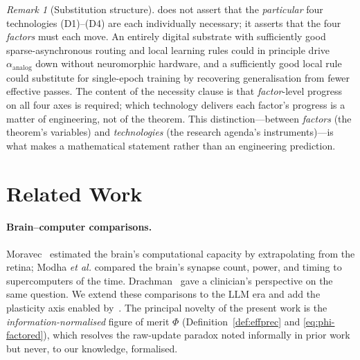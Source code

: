 \documentclass[11pt]{article}
\theoremstyle{definition}
\theoremstyle{remark}
\newtheorem{remark}[theorem]{Remark}
\begin{document}
\begin{remark}[Substitution structure]
\label{rem:substitution}
 does not assert that the \emph{particular} four
technologies (D1)--(D4) are each individually necessary; it asserts
that the four \emph{factors} must each move.  An entirely digital
substrate with sufficiently good sparse-asynchronous routing and
local learning rules could in principle drive
$\alpha_{\mathrm{analog}}$ down without neuromorphic hardware, and a
sufficiently good local rule could substitute for single-epoch
training by recovering generalisation from fewer effective passes.
The content of the necessity clause is that \emph{factor}-level
progress on all four axes is required; which technology delivers
each factor's progress is a matter of engineering, not of the
theorem.  This distinction---between \emph{factors} (the theorem's
variables) and \emph{technologies} (the research agenda's
instruments)---is what makes  a mathematical
statement rather than an engineering prediction.
\end{remark}

\section{Related Work}
\label{sec:related}

\paragraph{Brain--computer comparisons.}
Moravec~\cite{moravec1998robot} estimated the brain's computational
capacity by extrapolating from the retina; Modha \emph{et al.}
\cite{modha2009cognitive, modha2011ibmneurosynaptic} compared the
brain's synapse count, power, and timing to supercomputers of the
time.  Drachman~\cite{drachman2005we} gave a clinician's perspective
on the same question.  We extend these comparisons to the LLM era and
add the plasticity axis enabled
by~\cite{bartol2015nanoconnectomic}.  The principal novelty of the
present work is the \emph{information-normalised} figure of merit
$\Phi$ (Definition~\ref{def:effprec} and \cref{eq:phi-factored}),
which resolves the raw-update paradox noted informally in prior
work~\cite{modha2011ibmneurosynaptic} but never, to our knowledge,
formalised.
\end{document}
